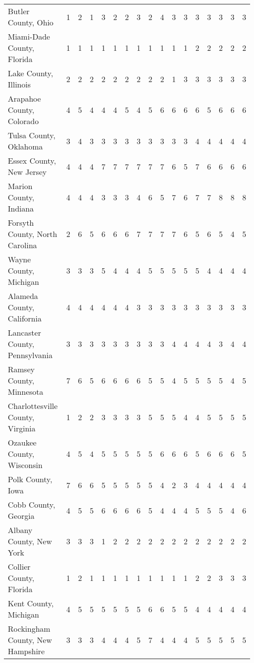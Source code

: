 \begin{landscape}
\begin{longtable}{lcccccccccccccccc}
	Butler County, Ohio & 1 & 2 & 1 & 3 & 2 & 2 & 3 & 2 & 4 & 3 & 3 & 3 & 3 & 3 & 3 & 3 \\
	Miami-Dade County, Florida & 1 & 1 & 1 & 1 & 1 & 1 & 1 & 1 & 1 & 1 & 1 & 2 & 2 & 2 & 2 & 2 \\
	Lake County, Illinois & 2 & 2 & 2 & 2 & 2 & 2 & 2 & 2 & 2 & 1 & 3 & 3 & 3 & 3 & 3 & 3 \\
	Arapahoe County, Colorado & 4 & 5 & 4 & 4 & 4 & 5 & 4 & 5 & 6 & 6 & 6 & 6 & 5 & 6 & 6 & 6 \\
	Tulsa County, Oklahoma & 3 & 4 & 3 & 3 & 3 & 3 & 3 & 3 & 3 & 3 & 3 & 4 & 4 & 4 & 4 & 4 \\
	Essex County, New Jersey & 4 & 4 & 4 & 7 & 7 & 7 & 7 & 7 & 7 & 6 & 5 & 7 & 6 & 6 & 6 & 6 \\
	Marion County, Indiana & 4 & 4 & 4 & 3 & 3 & 3 & 4 & 6 & 5 & 7 & 6 & 7 & 7 & 8 & 8 & 8 \\
	Forsyth County, North Carolina & 2 & 6 & 5 & 6 & 6 & 6 & 7 & 7 & 7 & 7 & 6 & 5 & 6 & 5 & 4 & 5 \\
	Wayne County, Michigan & 3 & 3 & 3 & 5 & 4 & 4 & 4 & 5 & 5 & 5 & 5 & 5 & 4 & 4 & 4 & 4 \\
	Alameda County, California & 4 & 4 & 4 & 4 & 4 & 4 & 3 & 3 & 3 & 3 & 3 & 3 & 3 & 3 & 3 & 3 \\
	Lancaster County, Pennsylvania & 3 & 3 & 3 & 3 & 3 & 3 & 3 & 3 & 3 & 4 & 4 & 4 & 4 & 3 & 4 & 4 \\
	Ramsey County, Minnesota & 7 & 6 & 5 & 6 & 6 & 6 & 6 & 5 & 5 & 4 & 5 & 5 & 5 & 5 & 4 & 5 \\
	Charlottesville County, Virginia & 1 & 2 & 2 & 3 & 3 & 3 & 3 & 5 & 5 & 5 & 4 & 4 & 5 & 5 & 5 & 5 \\
	Ozaukee County, Wisconsin & 4 & 5 & 4 & 5 & 5 & 5 & 5 & 5 & 6 & 6 & 6 & 5 & 6 & 6 & 6 & 5 \\
	Polk County, Iowa & 7 & 6 & 6 & 5 & 5 & 5 & 5 & 5 & 4 & 2 & 3 & 4 & 4 & 4 & 4 & 4 \\
	Cobb County, Georgia & 4 & 5 & 5 & 6 & 6 & 6 & 6 & 5 & 4 & 4 & 4 & 5 & 5 & 5 & 4 & 6 \\
	Albany County, New York & 3 & 3 & 3 & 1 & 2 & 2 & 2 & 2 & 2 & 2 & 2 & 2 & 2 & 2 & 2 & 2 \\
	Collier County, Florida & 1 & 2 & 1 & 1 & 1 & 1 & 1 & 1 & 1 & 1 & 1 & 2 & 2 & 3 & 3 & 3 \\
	Kent County, Michigan & 4 & 5 & 5 & 5 & 5 & 5 & 5 & 6 & 6 & 5 & 5 & 4 & 4 & 4 & 4 & 4 \\
	Rockingham County, New Hampshire & 3 & 3 & 3 & 4 & 4 & 4 & 5 & 7 & 4 & 4 & 4 & 5 & 5 & 5 & 5 & 5 \\

\end{longtable}
\end{landscape}
